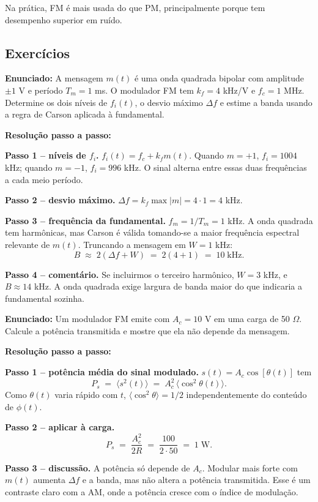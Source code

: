 \documentclass[11pt,a4paper]{article}
\begin{document}
Na prática, FM é mais usada do que PM, principalmente porque tem desempenho superior em ruído.

\subsection{Exercícios}

\begin{exercicio}
\textbf{Enunciado:} A mensagem $m(t)$ é uma onda quadrada bipolar com amplitude $\pm 1$ V e período $T_m=1$ ms. O modulador FM tem $k_f=4$ kHz/V e $f_c=1$ MHz. Determine os dois níveis de $f_i(t)$, o desvio máximo $\Delta f$ e estime a banda usando a regra de Carson aplicada à fundamental.

\textbf{Resolução passo a passo:}

\textbf{Passo 1 -- níveis de $f_i$.}
$f_i(t)=f_c+k_f m(t)$. Quando $m=+1$, $f_i=1004$ kHz; quando $m=-1$, $f_i=996$ kHz. O sinal alterna entre essas duas frequências a cada meio período.

\textbf{Passo 2 -- desvio máximo.}
$\Delta f = k_f\max|m| = 4\!\cdot\!1 = 4$ kHz.

\textbf{Passo 3 -- frequência da fundamental.}
$f_m = 1/T_m = 1$ kHz. A onda quadrada tem harmônicas, mas Carson é válida tomando-se a maior frequência espectral relevante de $m(t)$. Truncando a mensagem em $W=1$ kHz:
\[
  B \;\approx\; 2(\Delta f + W) \;=\; 2(4+1) \;=\; 10\;\text{kHz}.
\]

\textbf{Passo 4 -- comentário.}
Se incluirmos o terceiro harmônico, $W=3$ kHz, e $B\approx 14$ kHz. A onda quadrada exige largura de banda maior do que indicaria a fundamental sozinha.
\end{exercicio}

\begin{exercicio}
\textbf{Enunciado:} Um modulador FM emite com $A_c=10$ V em uma carga de 50 $\Omega$. Calcule a potência transmitida e mostre que ela não depende da mensagem.

\textbf{Resolução passo a passo:}

\textbf{Passo 1 -- potência média do sinal modulado.}
$s(t)=A_c\cos[\theta(t)]$ tem
\[
  P_s \;=\; \langle s^2(t)\rangle \;=\; A_c^2\,\langle\cos^2\theta(t)\rangle.
\]
Como $\theta(t)$ varia rápido com $t$, $\langle\cos^2\theta\rangle = 1/2$ independentemente do conteúdo de $\phi(t)$.

\textbf{Passo 2 -- aplicar à carga.}
\[
  P_s \;=\; \frac{A_c^2}{2R} \;=\; \frac{100}{2\cdot 50} \;=\; 1\;\text{W}.
\]

\textbf{Passo 3 -- discussão.}
A potência só depende de $A_c$. Modular mais forte com $m(t)$ aumenta $\Delta f$ e a banda, mas não altera a potência transmitida. Esse é um contraste claro com a AM, onde a potência cresce com o índice de modulação.
\end{exercicio}
\end{document}
